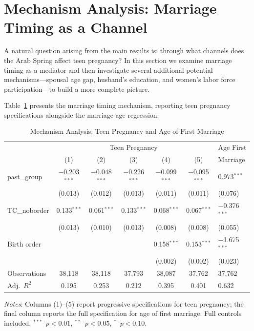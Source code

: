\documentclass[12pt,a4paper]{article}
\begin{document}
\section{Mechanism Analysis: Marriage Timing as a Channel}

A natural question arising from the main results is: through what channels does the Arab Spring affect teen pregnancy? In this section we examine marriage timing as a mediator and then investigate several additional potential mechanisms---spousal age gap, husband's education, and women's labor force participation---to build a more complete picture.

Table~\ref{tab:mechanism} presents the marriage timing mechanism, reporting teen pregnancy specifications alongside the marriage age regression.
\vspace{0.25cm}

\begin{table}[H]
\centering
\begin{threeparttable}
\caption{Mechanism Analysis: Teen Pregnancy and Age of First Marriage}
\label{tab:mechanism}
\small
\begin{tabular}{@{}lcccccl@{}}
\toprule
 & \multicolumn{5}{c}{Teen Pregnancy} & Age First \\
 & (1) & (2) & (3) & (4) & (5) & Marriage \\
\midrule
past\_group  & $-$0.203$^{***}$ & $-$0.048$^{***}$ & $-$0.226$^{***}$ & $-$0.099$^{***}$ & $-$0.095$^{***}$ & 0.973$^{***}$ \\
             & (0.013) & (0.012) & (0.013) & (0.011) & (0.011) & (0.076) \\[3pt]
TC\_noborder & 0.133$^{***}$ & 0.061$^{***}$ & 0.133$^{***}$ & 0.068$^{***}$ & 0.067$^{***}$ & $-$0.376$^{***}$ \\
             & (0.013) & (0.010) & (0.013) & (0.008) & (0.008) & (0.055) \\[3pt]
Birth order  & & & & 0.158$^{***}$ & 0.153$^{***}$ & $-$1.675$^{***}$ \\
             & & & & (0.002) & (0.002) & (0.023) \\[4pt]
\midrule
Observations & 38,118 & 38,118 & 37,793 & 38,087 & 37,762 & 37,762 \\
Adj.\ $R^2$  & 0.195  & 0.253  & 0.212  & 0.395  & 0.401  & 0.632 \\
\bottomrule
\end{tabular}
\begin{tablenotes}[flushleft]
\footnotesize
\item \textit{Notes}: Columns (1)--(5) report progressive specifications for teen pregnancy; the final column reports the full specification for age of first marriage. Full controls included. $^{***}$~$p<0.01$, $^{**}$~$p<0.05$, $^{*}$~$p<0.10$.
\end{tablenotes}
\end{threeparttable}
\end{table}
\end{document}
